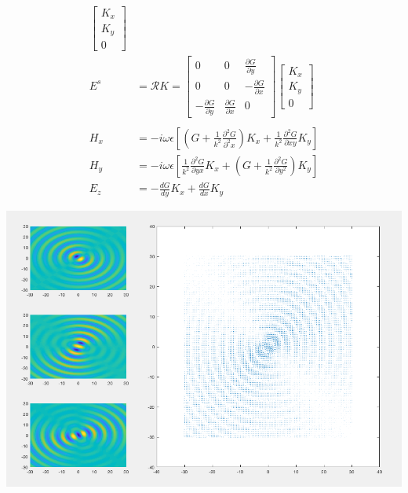 \documentclass{article}
\newcommand{\0}{\varnothing}
\begin{document}
\begin{minipage}{0.5\textwidth}
\begin{align*}
        \left[ \begin{array}{c} 
        K_x \\ K_y \\ 0 \end{array} \right]\\
         E^s &= \mathcal{R} K = \left[ \begin{array}{ccc} 0 & 0 & \frac{\partial G}{\partial y}\\ 
                            0 & 0 &-\frac{\partial G}{\partial x}\\ 
                            -\frac{\partial G}{\partial y} &\frac{\partial G}{\partial x} &0 \end{array} \right]
        \left[ \begin{array}{c} 
        K_x \\ K_y \\ 0 \end{array} \right]\\
        \ \\
        H_x &= -i\omega\epsilon \left[ \left( G + \frac{1}{k^2}\frac{\partial^2 G}{\partial^2 x} \right) K_x +
        \frac{1}{k^2}\frac{\partial^2 G}{\partial xy} K_y \right]\\
        H_y &= -i\omega\epsilon \left[ \frac{1}{k^2}\frac{\partial^2 G}{\partial yx} K_x +
        \left( G + \frac{1}{k^2}\frac{\partial^2 G}{\partial y^2} \right) K_y \right]\\
        E_z &= -\frac{dG}{dy} K_x + \frac{dG}{dx} K_y
\end{align*}
\end{minipage}
\begin{minipage}{0.5\textwidth}
{\centering
\includegraphics[width=1\columnwidth]{figures/KxyDipole}
}
\end{minipage}
\end{document}

